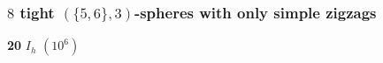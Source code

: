 \documentclass{beamer}
\begin{document}
\begin{frame}\frametitle{$8$  tight $(\{5,6\},3)$-spheres with only simple
zigzags}
\vspace{-3mm}
\begin{center}
\begin{minipage}{2.2cm}
\centering
{}\par
{\bf 20}  $I_h$ $(10^6)$
\end{minipage}
\begin{minipage}{2.3cm}
\centering
{}\par

\end{minipage}
\end{center}
\end{frame}
\end{document}
